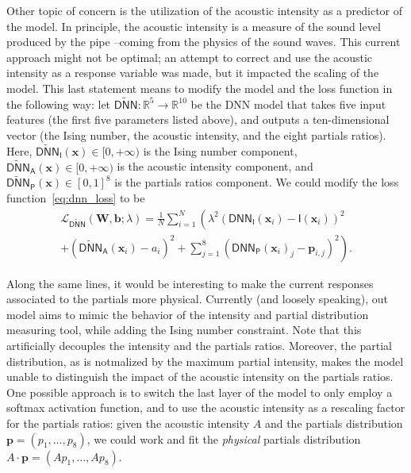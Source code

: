 \documentclass{psu-report}
\begin{document}
Other topic of concern is the utilization of the acoustic intensity as a
predictor of the model.
In principle, the acoustic intensity is a measure of the sound level
produced by the pipe --coming from the physics of the sound waves.
This current approach might not be optimal; an attempt to correct and use
the acoustic intensity as a response variable was made, but it impacted the
scaling of the model.
This last statement means to modify the model and the loss function in the
following way: let \(\widetilde{\mathsf{DNN}}: \mathbb{R}^5 \to \mathbb{R}^{10}\)
be the DNN model that takes five input features (the first five parameters 
listed above), and outputs a ten-dimensional vector (the Ising number, the
acoustic intensity, and the eight partials ratios).
Here, $\widetilde{\mathsf{DNN}}_\mathsf{I}(\mathbf{x}) \in [0, +\infty)$ is the Ising
number component, $\widetilde{\mathsf{DNN}}_\mathsf{A}(\mathbf{x}) \in [0, +\infty)$ is
the acoustic intensity component, and
$\widetilde{\mathsf{DNN}}_\mathsf{P}(\mathbf{x}) \in [0, 1]^8$ is the partials ratios
component.
We could modify the loss function~\eqref{eq:dnn_loss} to be
\begin{multline}
    \label{eq:dnn_loss_acoustic}
    \mathscr{L}_{\widetilde{\mathsf{DNN}}}(\mathbf{W}, \mathbf{b}; \lambda) =
    \frac{1}{N} \sum_{i=1}^N \left(
        \lambda^2 \left( \mathsf{DNN}_\mathsf{I}(\mathbf{x}_i) - \mathsf{I}(\mathbf{x}_i) \right)^2
        \right. \\
        \left. + \left( \widetilde{\mathsf{DNN}}_\mathsf{A}(\mathbf{x}_i) - a_i \right)^2
        +
        \sum_{j=1}^8 \left( \mathsf{DNN}_\mathsf{P}(\mathbf{x}_i)_j - \mathbf{p}_{i,j} \right)^2
    \right).
\end{multline}

Along the same lines, it would be interesting to make the current responses
associated to the partials more physical.
Currently (and loosely speaking), out model aims to mimic the behavior of the
intensity and partial distribution measuring tool, while adding the Ising
number constraint.
Note that this artificially decouples the intensity and the partials ratios.
Moreover, the partial distribution, as is notmalized by the maximum partial
intensity, makes the model unable to distinguish the impact of the acoustic
intensity on the partials ratios.
One possible approach is to switch the last layer of the model to only employ
a softmax activation function, and to use the acoustic intensity as a rescaling
factor for the partials ratios: given the acoustic intensity \(A\) and the
partials distribution \(\mathbf{p} = (p_1, \ldots, p_8)\), we could
work and fit the \emph{physical} partials distribution
\(A \cdot \mathbf{p} = (A p_1, \ldots, A p_8)\).
\end{document}
